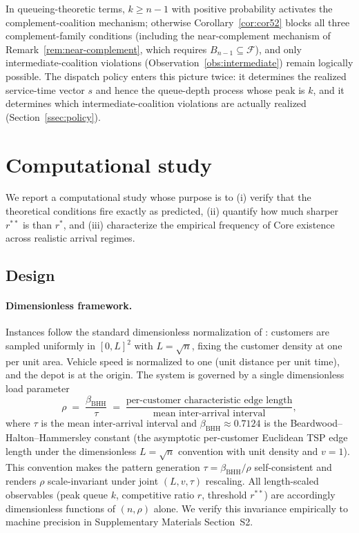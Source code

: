 \documentclass[11pt]{article}
\theoremstyle{plain}
\theoremstyle{definition}
\theoremstyle{remark}
\newcommand{\F}{\mathcal{F}}
\begin{document}
In queueing-theoretic terms, $k\ge n-1$ with positive probability activates the complement-coalition mechanism; otherwise Corollary~\ref{cor:cor52} blocks all three complement-family conditions (including the near-complement mechanism of Remark~\ref{rem:near-complement}, which requires $B_{n-1}\subseteq\F$), and only intermediate-coalition violations (Observation~\ref{obs:intermediate}) remain logically possible. The dispatch policy enters this picture twice: it determines the realized service-time vector $s$ and hence the queue-depth process whose peak is $k$, and it determines which intermediate-coalition violations are actually realized (Section~\ref{ssec:policy}).

\section{Computational study}
\label{sec:experiments}

We report a computational study whose purpose is to (i) verify that the theoretical conditions fire exactly as predicted, (ii) quantify how much sharper $r^{\ast\ast}$ is than $r^{\ast}$, and (iii) characterize the empirical frequency of Core existence across realistic arrival regimes.

\subsection{Design}
\label{ssec:design}

\paragraph{Dimensionless framework.} Instances follow the standard dimensionless normalization of \citet{steele1997probability}: customers are sampled uniformly in $[0,L]^2$ with $L=\sqrt{n}$, fixing the customer density at one per unit area. Vehicle speed is normalized to one (unit distance per unit time), and the depot is at the origin. The system is governed by a single dimensionless load parameter
\[
  \rho \;=\; \frac{\beta_{\mathrm{BHH}}}{\tau} \;=\; \frac{\text{per-customer characteristic edge length}}{\text{mean inter-arrival interval}},
\]
where $\tau$ is the mean inter-arrival interval and $\beta_{\mathrm{BHH}}\approx 0.7124$ is the Beardwood--Halton--Hammersley constant (the asymptotic per-customer Euclidean TSP edge length under the dimensionless $L=\sqrt{n}$ convention with unit density and $v=1$). This convention makes the pattern generation $\tau=\beta_{\mathrm{BHH}}/\rho$ self-consistent and renders $\rho$ scale-invariant under joint $(L,v,\tau)$ rescaling. All length-scaled observables (peak queue $k$, competitive ratio $r$, threshold $r^{\ast\ast}$) are accordingly dimensionless functions of $(n,\rho)$ alone. We verify this invariance empirically to machine precision in Supplementary Materials Section~S2.
\end{document}
